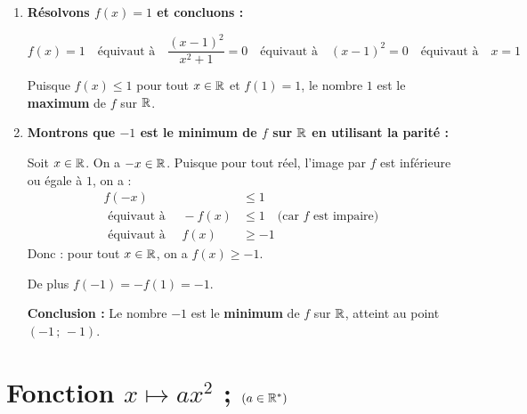 \documentclass[10pt, a4paper]{article}
\begin{document}
\begin{Solution}
\begin{enumerate}[leftmargin=*,itemsep=0.5pt]
\begin{enumerate}[leftmargin=*,itemsep=0.5pt]
        \item \textbf{Déduisons que $f(x) \leq 1$ :}

        Puisque $(x-1)^2 \geq 0$ et $x^2 + 1 > 0$, Alors : $\frac{(x-1)^2}{x^2+1} \geq 0$. \\
        Donc $1 - f(x) \geq 0$, d'où $f(x) \leq 1$.
    \end{enumerate}

    \item \textbf{Résolvons $f(x) = 1$ et concluons :}

    \[ f(x) = 1 \quad \text{équivaut à} \quad \frac{(x-1)^2}{x^2+1} = 0 
    \quad \text{équivaut à} \quad
    (x-1)^2 = 0 \quad \text{équivaut à} \quad x = 1 \]

    Puisque $f(x) \leq 1$ pour tout $x \in \mathbb{R}$ et $f(1) = 1$, le nombre $1$ est le \textbf{maximum} de $f$ sur $\mathbb{R}$.

    \item \textbf{Montrons que $-1$ est le minimum de $f$ sur $\mathbb{R}$ en utilisant la parité :}
    
Soit $x \in \mathbb{R}$. On a $-x \in \mathbb{R}$.
Puisque pour tout réel, l'image par $f$ est inférieure ou égale à $1$, on a :
\begin{align*}
    f(-x) &\leq 1 \\
    \text{ équivaut à } \quad -f(x) &\leq 1 \quad \text{(car } f \text{ est impaire)} \\
    \text{ équivaut à } \quad f(x) &\geq -1
\end{align*}
Donc : \quad pour tout $x \in \mathbb{R}$, on a $f(x) \geq -1$.

    De plus $f(-1) = -f(1) = -1$.

    \textbf{Conclusion :} Le nombre $-1$ est le \textbf{minimum} de $f$ sur $\mathbb{R}$, atteint au point $(-1\,;\,-1)$.
\end{enumerate}
\end{Solution}



\section{Fonction $x \mapsto ax^2$ ; $(a \in \mathbb{R}^*)$ }
\end{document}
